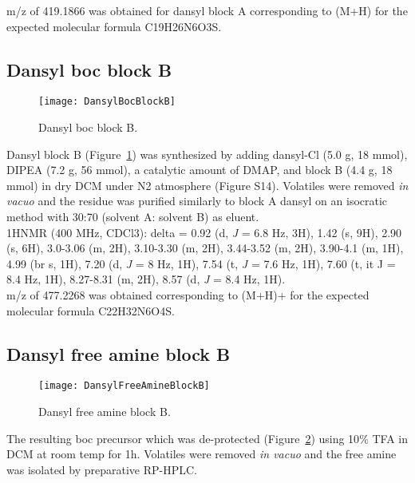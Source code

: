 \noindent
m/z of 419.1866 was obtained for dansyl block A corresponding to (M+H) for the expected molecular formula C19H26N6O3S. \\

\clearpage

\subsection{Dansyl boc block B}

\begin{figure}
\centering
\texttt{[image: DansylBocBlockB]}
\caption{Dansyl boc block B.}
\label{fig:DansylBocBlockBSynth}
\end{figure}

Dansyl block B (Figure~\ref{fig:DansylBocBlockBSynth}) was synthesized by adding dansyl-Cl (5.0 g, 18 mmol), DIPEA (7.2 g, 56 mmol), a catalytic amount of DMAP, and block B (4.4 g, 18 mmol) in dry DCM under N2 atmosphere (Figure S14). Volatiles were removed {\it in vacuo} and the residue was purified similarly to block A dansyl on an isocratic method with 30:70 (solvent A: solvent B) as eluent. \\

\noindent
1HNMR (400 MHz, CDCl3): delta = 0.92 (d, {\it J} = 6.8 Hz, 3H), 1.42 (s, 9H), 2.90 (s, 6H), 3.0-3.06 (m, 2H), 3.10-3.30 (m, 2H), 3.44-3.52 (m, 2H), 3.90-4.1 (m, 1H), 4.99 (br s, 1H), 7.20 (d, {\it J} = 8 Hz, 1H), 7.54 (t, {\it J} = 7.6 Hz, 1H), 7.60 (t, {it J} = 8.4 Hz, 1H), 8.27-8.31 (m, 2H), 8.57 (d, {\it J} = 8.4 Hz, 1H). \\

\noindent
m/z of 477.2268 was obtained corresponding to (M+H)+ for the expected molecular formula C22H32N6O4S. \\

\clearpage

\subsection{Dansyl free amine block B}

\begin{figure}
\centering
\texttt{[image: DansylFreeAmineBlockB]}
\caption{Dansyl free amine block B.}
\label{fig:DansylFreeAmineBlockB}
\end{figure}

The resulting boc precursor which was de-protected (Figure~\ref{fig:DansylFreeAmineBlockB}) using 10{\%} TFA in DCM at room temp for 1h. Volatiles were removed {\it in vacuo} and the free amine was isolated by preparative RP-HPLC. \\

